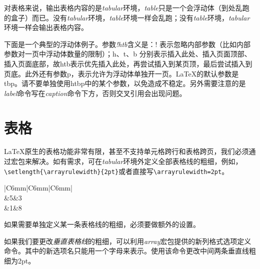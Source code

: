 对表格来说，输出表格内容的是\emph{tabular}环境，\emph{table}只是一个会浮动体（到处乱跑的盒子）而已。没有\emph{tabular}环境，\emph{table}环境一样会乱跑；没有\emph{table}环境，\emph{tabular}环境一样会输出表格内容。

下面是一个典型的浮动体例子。参数\emph{!htb}含义是：! 表示忽略内部参数（比如内部参数对一页中浮动体数量的限制）；h、t、b 分别表示插入此处、插入页面顶部、插入页面底部，故htb表示优先插入此处，再尝试插入到某页顶，最后尝试插入到页底。此外还有参数p，表示允许为浮动体单独开一页。\LaTeX 的默认参数是tbp。请不要单独使用htbp中的某个参数，以免造成不稳定。另外需要注意的是\emph{label}命令写在\emph{caption}命令下方，否则交叉引用会出现问题。


\section{表格}
\LaTeX 原生的表格功能非常有限，甚至不支持单元格跨行和表格跨页，我们必须通过宏包来解决。如有需求，可在\emph{tabular}环境外定义全部表格线的粗细，例如，\verb|\setlength{\arrayrulewidth}{2pt}|或者直接写\verb|\arrayrulewidth=2pt|。

\begin{codeshow}
\centering
\arrayrulewidth=1pt%
\begin{tabular}
    {|C{6mm}|C{6mm}|C{6mm}|}
    \hline
    \\
    &5&3\\
    &1&8\\
    \hline
\end{tabular}
\end{codeshow}

如果需要单独定义某一条表格线的粗细，必须要做额外的设置。

如果我们要更改\emph{垂直表格线}的粗细，可以利用\emph{array}宏包提供的新列格式选项定义命令。其中的新选项名只能用一个字母来表示。使用该命令更改中间两条垂直线粗细为2pt。

